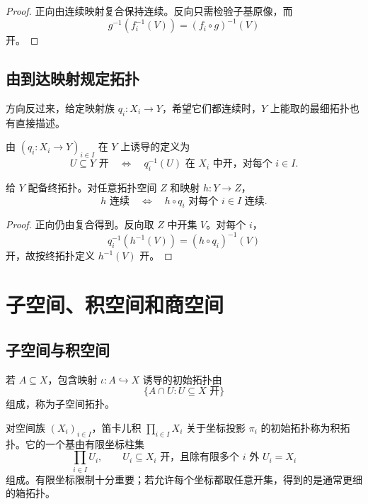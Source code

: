 \begin{proof}
正向由连续映射复合保持连续。反向只需检验子基原像，而
\[
 g^{-1}(f_i^{-1}(V))=(f_i\circ g)^{-1}(V)
\]
开。
\end{proof}

\subsection{由到达映射规定拓扑}

方向反过来，给定映射族 \(q_i:X_i\to Y\)，希望它们都连续时，\(Y\) 上能取的最细拓扑也有直接描述。

\begin{definition}[终拓扑]
由 \((q_i:X_i\to Y)_{i\in I}\) 在 \(Y\) 上诱导的定义为
\[
 U\subseteq Y\text{ 开}
 \quad\Longleftrightarrow\quad
 q_i^{-1}(U)\text{ 在 }X_i\text{ 中开，对每个 }i\in I.
\]
\end{definition}

\begin{theorem}[终拓扑的泛性质]
\label{thm:final-topology-universal-property}
给 \(Y\) 配备终拓扑。对任意拓扑空间 \(Z\) 和映射 \(h:Y\to Z\)，
\[
 h\text{ 连续}
 \quad\Longleftrightarrow\quad
 h\circ q_i\text{ 对每个 }i\in I\text{ 连续}.
\]
\end{theorem}

\begin{proof}
正向仍由复合得到。反向取 \(Z\) 中开集 \(V\)。对每个 \(i\)，
\[
 q_i^{-1}(h^{-1}(V))=(h\circ q_i)^{-1}(V)
\]
开，故按终拓扑定义 \(h^{-1}(V)\) 开。
\end{proof}

\section{子空间、积空间和商空间}

\subsection{子空间与积空间}

若 \(A\subseteq X\)，包含映射 \(\iota:A\hookrightarrow X\) 诱导的初始拓扑由
\[
 \{A\cap U:U\subseteq X\text{ 开}\}
\]
组成，称为子空间拓扑。

对空间族 \((X_i)_{i\in I}\)，笛卡儿积 \(\prod_{i\in I}X_i\) 关于坐标投影 \(\pi_i\) 的初始拓扑称为积拓扑。它的一个基由有限坐标柱集
\[
 \prod_{i\in I}U_i,
 \qquad U_i\subseteq X_i\text{ 开，且除有限多个 }i\text{ 外 }U_i=X_i
\]
组成。有限坐标限制十分重要；若允许每个坐标都取任意开集，得到的是通常更细的箱拓扑。

